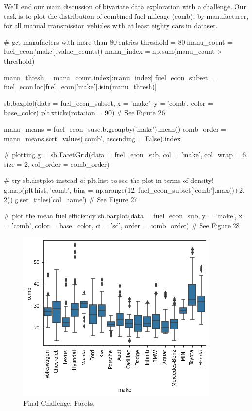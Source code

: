 \newpage
We'll end our main discussion of bivariate data exploration with a challenge. Our task is to plot the distribution of combined fuel mileage (comb), by manufacturer, for all manual transmission vehicles with at least eighty cars in dataset.

\begin{python}
	# get manufacters with more than 80 entries
	threshold = 80
	manu_count = fuel_econ['make'].value_counts()
	manu_index = np.sum(manu_count > threshold)
	
	manu_thresh = manu_count.index[:manu_index]
	fuel_econ_subset = fuel_econ.loc[fuel_econ['make'].isin(manu_thresh)]
	
	sb.boxplot(data = fuel_econ_subset, x = 'make', y = 'comb', color = base_color)
	plt.xticks(rotation = 90)
	# See Figure 26
	
	manu_means = fuel_econ_susetb.groupby('make').mean()
	comb_order = manu_means.sort_values('comb', ascending = False).index
	
	
	# plotting
	g = sb.FacetGrid(data = fuel_econ_sub, col = 'make', col_wrap = 6, size = 2, col_order = comb_order)
	
	# try sb.distplot instead of plt.hist to see the plot in terms of density!
	g.map(plt.hist, 'comb', bins = np.arange(12, fuel_econ_subset['comb'].max()+2, 2))
	g.set_titles('{col_name}')
	# See Figure 27
	
	# plot the mean fuel efficiency
	sb.barplot(data = fuel_econ_sub, y = 'make', x = 'comb', color = base_color, ci = 'sd', order = comb_order)
	# See Figure 28
\end{python}

\begin{figure}
	\includegraphics{images/figure26.png}
	\caption{Final Challenge: Facets.}\label{fig:figure26}
\end{figure}

